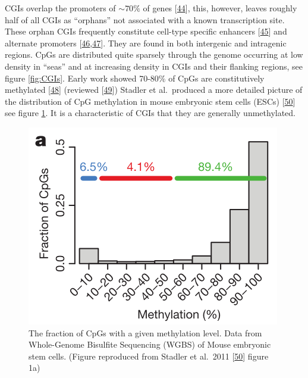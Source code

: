\documentclass[
]{book}
\begin{document}
CGIs overlap the promoters of \(\sim70\%\) of genes {[}\protect\hyperlink{ref-Saxonov2006}{44}{]}, this, however, leaves roughly half of all CGIs as ``orphans'' not associated with a known transcription site.
These orphan CGIs frequently constitute cell-type specific enhancers {[}\protect\hyperlink{ref-Bell2017}{45}{]} and alternate promoters {[}\protect\hyperlink{ref-Illingworth2010}{46},\protect\hyperlink{ref-Maunakea2010}{47}{]}.
They are found in both intergenic and intragenic regions.
CpGs are distributed quite sparsely through the genome occurring at low density in ``seas'' and at increasing density in CGIs and their flanking regions, see figure \ref{fig:CGIs}.
Early work showed 70-80\% of CpGs are constitutively methylated {[}\protect\hyperlink{ref-Ehrlich1982}{48}{]} (reviewed {[}\protect\hyperlink{ref-Bird2002}{49}{]}) Stadler et al.~produced a more detailed picture of the distribution of CpG methylation in mouse embryonic stem cells (ESCs) {[}\protect\hyperlink{ref-Stadler2011}{50}{]} see figure \ref{fig:CpGfreqVsDNAm}.
It is a characteristic of CGIs that they are generally unmethylated.

\begin{figure}

{\centering \includegraphics[width=0.8\linewidth]{figs/CpGfreqVsDNAm} 

}

\caption{The fraction of CpGs with a given methylation level. Data from Whole-Genome Bisulfite Sequencing (WGBS) of Mouse embryonic stem cells. (Figure reproduced from Stadler et al.~2011 {[}\protect\hyperlink{ref-Stadler2011}{50}{]} figure 1a)}\label{fig:CpGfreqVsDNAm}
\end{figure}
\end{document}
